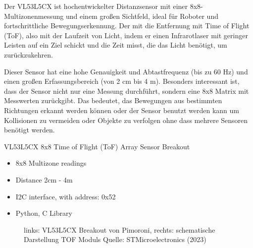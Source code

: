 \documentclass[
  11pt,
  a4paper,
  oneside, openany  ,captions=tableheading
]{scrbook}
\providecommand{\tightlist}{%
  \setlength{\itemsep}{0pt}\setlength{\parskip}{0pt}}
\theoremstyle{remark}
\renewcommand{\markright}[1]{\def\chaptertitle{#1}} %
\begin{document}
\markright{VL53L5CX 8x8 Time of Flight (ToF) Array
Sensor\index{VL53L5CX}}

Der VL53L5CX ist hochentwickelter Distanzsensor mit einer
8x8-Multizonenmessung und einem großen Sichtfeld, ideal für Roboter und
fortschrittliche Bewegungserkennung. Der mit die Entfernung mit Time of
Flight (ToF), also mit der Laufzeit von Licht, indem er einen
Infrarotlaser mit geringer Leisten auf ein Ziel schickt und die Zeit
misst, die das Licht benötigt, um zurückzukehren.

Dieser Sensor hat eine hohe Genauigkeit und Abtastfrequenz (bis zu 60
Hz) und einen großen Erfassungsbereich (von 2 cm bis 4 m). Besonders
interessant ist, dass der Sensor nicht nur eine Messung durchführt,
sondern eine 8x8 Matrix mit Messwerten zurückgibt. Das bedeutet, das
Bewegungen aus bestimmten Richtungen erkannt werden können oder der
Sensor benutzt werden kann um Kollisionen zu vermeiden oder Objekte zu
verfolgen ohne dass mehrere Sensoren benötigt werden.

VL53L5CX 8x8 Time of Flight (ToF) Array Sensor Breakout

\begin{itemize}
\tightlist
\item
  8x8 Multizone readings
\item
  Distance 2cm - 4m
\item
  I2C interface, with address: 0x52
\item
  Python, C Library
\end{itemize}

\begin{figure}


\caption{\label{fig-vl53l5cx}links: VL53L5CX Breakout von Pimoroni,
rechts: schematische Darstellung TOF Moduls Quelle: STMicroelectronics
(2023)}

\end{figure}%
\end{document}
